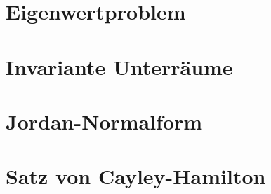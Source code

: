 %
%
%





                                                              

\section{Eigenwertproblem}

\section{Invariante Unterräume}

\section{Jordan-Normalform}

\section{Satz von Cayley-Hamilton}

